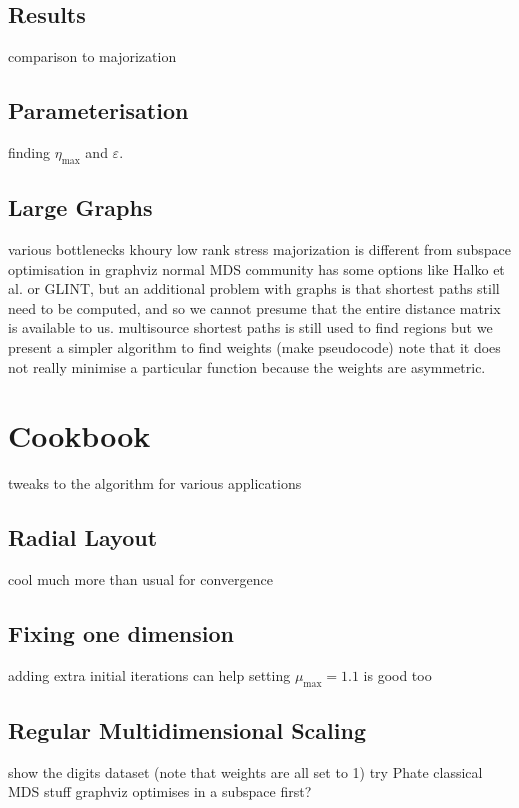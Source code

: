\subsection{Results}
comparison to majorization
\subsection{Parameterisation}
finding $\eta_{\max}$ and $\varepsilon$.
\subsection{Large Graphs}
various bottlenecks
khoury low rank stress majorization is different from subspace optimisation in graphviz
normal MDS community has some options like Halko et al. or GLINT, but an additional problem with graphs is that shortest paths still need to be computed, and so we cannot presume that the entire distance matrix is available to us.
multisource shortest paths is still used to find regions
but we present a simpler algorithm to find weights (make pseudocode)
note that it does not really minimise a particular function because the weights are asymmetric.

\section{Cookbook}
tweaks to the algorithm for various applications
\subsection{Radial Layout}
cool much more than usual for convergence
\subsection{Fixing one dimension}
adding extra initial iterations can help
setting $\mu_{\max}=1.1$ is good too
\subsection{Regular Multidimensional Scaling}
show the digits dataset (note that weights are all set to 1)
try Phate classical MDS stuff
graphviz optimises in a subspace first?